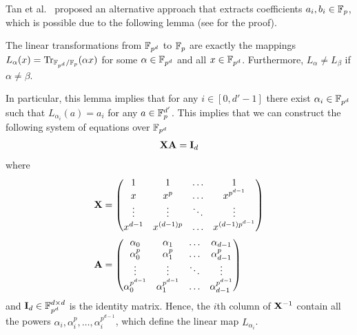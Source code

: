   Tan et al.~\cite{TLWRK20} proposed an alternative approach that extracts coefficients $a_i, b_i \in \mathbb{F}_p$, which is possible due to the following lemma (see \cite[Theorem 2.24]{LN86} for the proof).
  \begin{lemma}\label{lem:extraction}
    The linear transformations from $\mathbb{F}_{p^d}$ to $\mathbb{F}_p$ are exactly the mappings $L_{\alpha}(x) = \mathrm{Tr}_{\mathbb{F}_{p^d}/\mathbb{F}_p}(\alpha x)$ for some $\alpha \in \mathbb{F}_{p^d}$ and all $x \in \mathbb{F}_{p^d}$.
    Furthermore, $L_{\alpha} \ne L_{\beta}$ if $\alpha \ne \beta$.
  \end{lemma}
  In particular, this lemma implies that for any $i \in [0,d'-1]$ there exist $\alpha_i \in \mathbb{F}_{p^d}$ such that $L_{\alpha_i}(a) = a_i$ for any $a \in \mathbb{F}_p^{d'}$.
  This implies that we can construct the following system of equations over $\mathbb{F}_{p^d}$ 
  \begin{align*}
    \mathbf{X} \mathbf{A}
    =
    \mathbf{I}_{d}
  \end{align*}
  where
  \begin{align*}
  \mathbf{X} &= \begin{pmatrix}
      1       & 1       & \dots   & 1             \\
      x       & x^p     & \dots   & x^{p^{d-1}}   \\
      \vdots  & \vdots  & \ddots  & \vdots        \\
      x^{d-1}     & x^{(d-1)p}    & \dots   & x^{(d-1)p^{d-1}}  \\
    \end{pmatrix}
    \\
    \mathbf{A} &= \begin{pmatrix}
      \alpha_0      & \alpha_1      & \dots   & \alpha_{d-1}      \\
      \alpha_0^{p}  & \alpha_1^{p}  & \dots   & \alpha_{d-1}^{p}  \\
      \vdots        & \vdots        & \ddots  & \vdots            \\
      \alpha_0^{p^{d-1}}  & \alpha_1^{p^{d-1}}  & \dots   & \alpha_{d-1}^{p^{d-1}}  \\
    \end{pmatrix}
  \end{align*}
  and $\mathbf{I}_d \in \mathbb{F}_{p^d}^{d \times d}$ is the identity matrix.
  Hence, the $i$th column of ${{\mathbf{X}}^{-1}}$ contain all the powers $\alpha_i, \alpha_i^p, \dots, \alpha_i^{p^{d-1}}$, which define the linear map $L_{\alpha_i}$.

